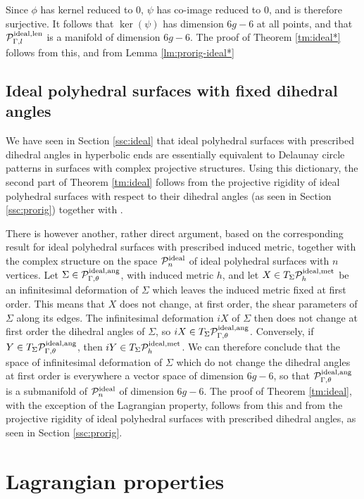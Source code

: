 \documentclass[notitlepage,twoside,a4paper]{amsart}
\newcommand{\Pidang}{\cP^{\rm ideal,ang}_{\Gamma,\theta}}
\newcommand{\Pidlen}{\cP^{\rm ideal,len}_{\Gamma,l}}
\newcommand{\Pidmet}{\cP^{\rm ideal,met}_{h}}
\newcommand{\Pidn}{\cP^{\rm ideal}_{n}}
\theoremstyle{named}
\newcommand{\cP}{{\mathcal P}}
\begin{document}
Since $\phi$ has kernel reduced to $0$, $\psi$ has co-image reduced to $0$, and is therefore surjective. It follows that $\ker(\psi)$ has dimension $6g-6$ at all points, and that $\Pidlen$ is a manifold of dimension $6g-6$. The proof of Theorem \ref{tm:ideal*} follows from this, and from Lemma \ref{lm:prorig-ideal*}


\subsection{Ideal polyhedral surfaces with fixed dihedral angles}
\label{ssc:defo-ideal*}

We have seen in Section \ref{ssc:ideal} that ideal polyhedral surfaces with prescribed dihedral angles in hyperbolic ends are essentially equivalent to Delaunay circle patterns in surfaces with complex projective structures. Using this dictionary, the second part of Theorem \ref{tm:ideal} follows from the projective rigidity of ideal polyhedral surfaces with respect to their dihedral angles (as seen in Section \ref{ssc:prorig}) together with \cite[Cor. 1.4]{lam:pullback}.

There is however another, rather direct argument, based on the corresponding result for ideal polyhedral surfaces with prescribed induced metric, together with the complex structure on the space $\Pidn$ of ideal polyhedral surfaces with $n$ vertices. Let $\Sigma\in \Pidang$, with induced metric $h$, and let $X\in T_{\Sigma}\Pidmet$ be an infinitesimal deformation of $\Sigma$ which leaves the induced metric fixed at first order. This means that $X$ does not change, at first order, the shear parameters of $\Sigma$ along its edges. The infinitesimal deformation $iX$ of $\Sigma$ then does not change at first order the dihedral angles of $\Sigma$, so $iX\in T_\Sigma\Pidang$. Conversely, if $Y\in T_\Sigma\Pidang$, then $iY\in T_\Sigma\Pidmet$. We can therefore conclude that the space of infinitesimal deformation of $\Sigma$ which do not change the dihedral angles at first order is everywhere a vector space of dimension $6g-6$, so that $\Pidang$ is a submanifold of $\Pidn$ of dimension $6g-6$. The proof of Theorem \ref{tm:ideal}, with the exception of the Lagrangian property, follows from this and from the projective rigidity of ideal polyhedral surfaces with prescribed dihedral angles, as seen in Section \ref{ssc:prorig}.

\section{Lagrangian properties}
\label{sc:lagrangian}
\end{document}
